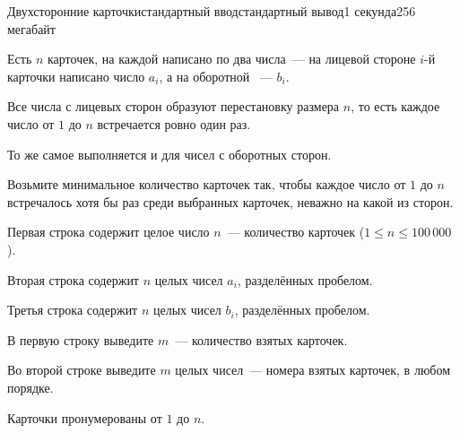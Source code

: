 \begin{problem}{Двухсторонние карточки}{стандартный ввод}{стандартный вывод}{1 секунда}{256 мегабайт}

Есть $n$ карточек, на каждой написано по два числа~--- на лицевой стороне $i$-й карточки написано число $a_i$, а на оборотной ~--- $b_i$.

Все числа с лицевых сторон образуют перестановку размера $n$, то есть каждое число от $1$ до $n$ встречается ровно один раз.

То же самое выполняется и для чисел с оборотных сторон.

Возьмите минимальное количество карточек так, чтобы каждое число от $1$ до $n$ встречалось хотя бы раз среди выбранных карточек, неважно на какой из сторон.

\InputFile
Первая строка содержит целое число $n$~--- количество карточек ($1 \leq n \leq 100\,000$).

Вторая строка содержит $n$ целых чисел $a_i$, разделённых пробелом.

Третья строка содержит $n$ целых чисел $b_i$, разделённых пробелом.

\OutputFile
В первую строку выведите $m$~--- количество взятых карточек.

Во второй строке выведите $m$ целых чисел~--- номера взятых карточек, в любом порядке.

Карточки пронумерованы от $1$ до $n$.

\Examples

\begin{example}
%
%
\end{example}

\end{problem}

